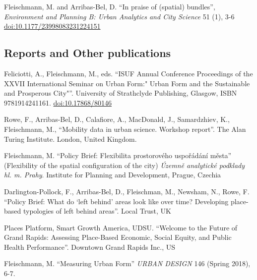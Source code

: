 \documentclass[12pt,a4paper]{report}
\begin{document}
    \begin{tablist}

        \item[2024] \tab{}Fleischmann, M. and Arribas-Bel, D. \enquote{In praise of (spatial) bundles}, \textit{Environment and Planning B: Urban Analytics and City Science} 51 (1), 3-6 \href{https://doi.org/10.1177/23998083231224151}{doi:10.1177/23998083231224151}

    \end{tablist}

    \subsection*{Reports and Other publications}

    \begin{tablist}

        \item[2022] \tab{}Feliciotti, A., Fleischmann, M., eds. \enquote{ISUF Annual Conference Proceedings of the XXVII International Seminar on Urban Form:" Urban Form and the Sustainable and Prosperous City"}. University of Strathclyde Publishing, Glasgow, ISBN 9781914241161. \href{https://doi.org/10.17868/80146}{doi:10.17868/80146}
        \item[2022] \tab{}Rowe, F., Arribas-Bel, D., Calafiore, A., MacDonald, J., Samardzhiev, K., Fleischmann, M., \enquote{Mobility data in urban science. Workshop report}. The Alan Turing Institute. London, United Kingdom.
        \item[2021] \tab{}Fleischmann, M. \enquote{Policy Brief: Flexibilita prostorového uspořádání města} (Flexibility of the spatial configuration of the city) \textit{Územně analytické podklady hl. m. Prahy}. Institute for Planning and Development, Prague, Czechia
        \item[2021] \tab{}Darlington-Pollock, F., Arribas-Bel, D., Fleischman, M., Newsham, N., Rowe, F. \enquote{Policy Brief: What do ‘left behind’ areas look like over time? Developing place-based typologies of left behind areas}. Local Trust, UK
        \item[2020] \tab{}Places Platform, Smart Growth America, UDSU. \enquote{Welcome to the Future of Grand Rapids: Assessing Place-Based Economic, Social Equity, and Public Health Performance}. Downtown Grand Rapids Inc., US
        \item[2018] \tab{}Fleischmann, M. \enquote{Measuring Urban Form} \textit{URBAN DESIGN} 146 (Spring 2018), 6-7.

    \end{tablist}
\end{document}
